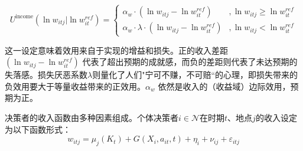 \documentclass[master, final]{zufe-thesis}
\begin{document}
\begin{equation}
U^{\text{income}}(\ln w_{itj} | \ln w_{it}^{ref}) =
\begin{cases}
\alpha_w \cdot (\ln w_{itj} - \ln w_{it}^{ref}) &, \ln w_{itj} \ge \ln w_{it}^{ref}\\
\alpha_w \cdot \lambda \cdot (\ln w_{itj} - \ln w_{it}^{ref}) &, \ln w_{itj} < \ln w_{it}^{ref}
\end{cases}
\label{eq:收入效用函数}
\end{equation}

这一设定意味着效用来自于实现的增益和损失。正的收入差距 $(\ln w_{itj} - \ln w_{it}^{ref})$ 代表了超出预期的成就感，而负的差距则代表了未达预期的失落感。损失厌恶系数$\lambda$则量化了人们"宁可不赚，不可赔“的心理，即损失带来的负效用要大于等量收益带来的正效用。$\alpha_w$ 依然是收入的（收益域）边际效用，预期为正。


决策者的收入函数由多种因素组成。个体决策者$i \in \mathcal{N}$在时期$t$、地点$j$的收入设定为以下函数形式：
\begin{equation}
    w_{itj}=\mu_j(K_t)+G(X_i, a_{it}, t)+\eta_i+\nu_{ij}+\varepsilon_{itj}
  \label{eq:收入函数}
\end{equation}
\end{document}
